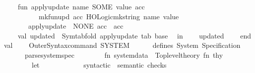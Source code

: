 \begin{isabellebody}
\isanewline
\ \ \ \ fun\ apply{\isacharunderscore}{\kern0pt}update\ {\isacharparenleft}{\kern0pt}name{\isacharcomma}{\kern0pt}\ SOME\ value{\isacharparenright}{\kern0pt}\ acc\ {\isacharequal}{\kern0pt}\isanewline
\ \ \ \ \ \ \ \ \ \ mk{\isacharunderscore}{\kern0pt}fun{\isacharunderscore}{\kern0pt}upd\ {\isacharparenleft}{\kern0pt}acc{\isacharcomma}{\kern0pt}\ HOLogic{\isachardot}{\kern0pt}mk{\isacharunderscore}{\kern0pt}string\ name{\isacharcomma}{\kern0pt}\ value{\isacharparenright}{\kern0pt}\isanewline
\ \ \ \ \ \ {\isacharbar}{\kern0pt}\ apply{\isacharunderscore}{\kern0pt}update\ {\isacharparenleft}{\kern0pt}{\isacharunderscore}{\kern0pt}{\isacharcomma}{\kern0pt}\ NONE{\isacharparenright}{\kern0pt}\ acc\ {\isacharequal}{\kern0pt}\ acc\isanewline
\isanewline
\ \ \ \ val\ updated\ {\isacharequal}{\kern0pt}\ Symtab{\isachardot}{\kern0pt}fold\ apply{\isacharunderscore}{\kern0pt}update\ tab\ base\isanewline
\ \ in\isanewline
\ \ \ \ updated\ \ \isanewline
\ \ end\isanewline
\isanewline
val\ {\isacharunderscore}{\kern0pt}\ {\isacharequal}{\kern0pt}\isanewline
\ \ Outer{\isacharunderscore}{\kern0pt}Syntax{\isachardot}{\kern0pt}command\ \isactrlcommandUNDERSCOREkeyword {\isasymopen}SYSTEM{\isasymclose}\isanewline
\ \ \ \ \ \ {\isachardoublequote}{\kern0pt}defines\ System\ Specification{\isachardoublequote}{\kern0pt}\isanewline
\ \ \ \ \ \ {\isacharparenleft}{\kern0pt}parse{\isacharunderscore}{\kern0pt}system{\isacharunderscore}{\kern0pt}spec\ {\isachargreater}{\kern0pt}{\isachargreater}{\kern0pt}\isanewline
\ \ \ \ \ \ \ {\isacharparenleft}{\kern0pt}fn\ system{\isacharunderscore}{\kern0pt}data\ {\isacharequal}{\kern0pt}{\isachargreater}{\kern0pt}\ Toplevel{\isachardot}{\kern0pt}theory\ {\isacharparenleft}{\kern0pt}fn\ thy\ {\isacharequal}{\kern0pt}{\isachargreater}{\kern0pt}\isanewline
\ \ \ \ \ \ \ \ let\isanewline
\ \ \ \ \ \ \ \ \ \ {\isacharparenleft}{\kern0pt}{\isacharasterisk}{\kern0pt}\ {}{\isachardot}{\kern0pt}\ syntactic\ {\isacharampersand}{\kern0pt}\ semantic\ checks\ {\isacharminus}{\kern0pt}{\isacharminus}{\kern0pt}{\isacharminus}{\kern0pt}{\isacharminus}{\kern0pt}{\isacharminus}{\kern0pt}{\isacharminus}{\kern0pt}{\isacharminus}{\kern0pt}{\isacharminus}{\kern0pt}{\isacharminus}{\kern0pt}{\isacharminus}{\kern0pt}{\isacharminus}{\kern0pt}{\isacharminus}{\kern0pt}{\isacharminus}{\kern0pt}{\isacharminus}{\kern0pt}{\isacharminus}{\kern0pt}{\isacharminus}{\kern0pt}{\isacharminus}{\kern0pt}{\isacharminus}{\kern0pt}{\isacharminus}{\kern0pt}{\isacharminus}{\kern0pt}{\isacharminus}{\kern0pt}{\isacharminus}{\kern0pt}{\isacharminus}{\kern0pt}{\isacharminus}{\kern0pt}{\isacharminus}{\kern0pt}{\isacharminus}{\kern0pt}{\isacharminus}{\kern0pt}{\isacharminus}{\kern0pt}{\isacharminus}{\kern0pt}{\isacharminus}{\kern0pt}{\isacharminus}{\kern0pt}{\isacharminus}{\kern0pt}\ {\isacharasterisk}{\kern0pt}{\isacharparenright}{\kern0pt}\isanewline

\end{isabellebody}
